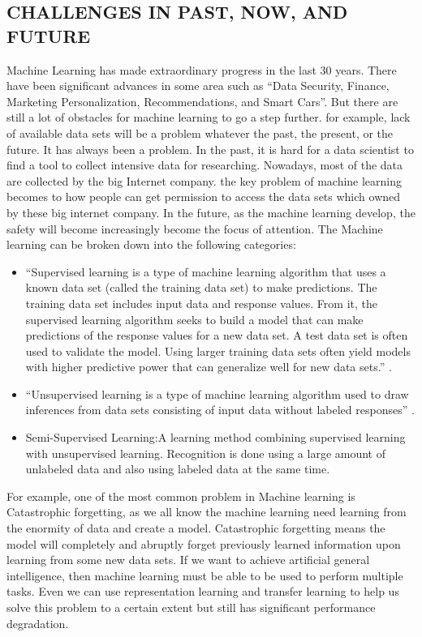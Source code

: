 \documentclass[sigconf]{acmart}
\begin{document}
\subsection{CHALLENGES IN PAST, NOW, AND FUTURE}
Machine Learning has made extraordinary progress in the last 30 years. There have been significant advances in some area such as ``Data Security, Finance, Marketing Personalization, Recommendations, and Smart Cars''. But there are still a lot of obstacles for machine learning to go a step further. for example, lack of available data sets will be a problem whatever the past, the present, or the future. It has always been a problem. In the past, it is hard for a data scientist to find a tool to collect intensive data for researching. Nowadays, most of the data are collected by the big Internet company. the key problem of machine learning becomes to how people can get permission to access the data sets which owned by these big internet company. In the future, as the machine learning develop, the safety will become increasingly become the focus of attention. The Machine learning can be broken down into the following categories:
\begin{itemize}

  \item ``Supervised learning is a type of machine learning algorithm that uses a known data set (called the training data set) to make predictions. The training data set includes input data and response values. From it, the supervised learning algorithm seeks to build a model that can make predictions of the response values for a new data set. A test data set is often used to validate the model. Using larger training data sets often yield models with higher predictive power that can generalize well for new data sets.'' \cite{Mathworks02}.
  
  
  \item ``Unsupervised learning is a type of machine learning algorithm used to draw inferences from data sets consisting of input data without labeled responses'' \cite{Mathworks01}.
  
  
  \item Semi-Supervised Learning:A learning method combining supervised learning with unsupervised learning. Recognition is done using a large amount of unlabeled data and also using labeled data at the same time.
  

  
\end{itemize}
For example, one of the most common problem in Machine learning is Catastrophic forgetting, as we all know the machine learning need learning from the enormity of data and create a model. Catastrophic forgetting means the model will completely and abruptly forget previously learned information upon learning from some new data sets. If we want to achieve artificial general intelligence, then machine learning must be able to be used to perform multiple tasks. Even we can use representation learning and transfer learning to help us solve this problem to a certain extent but still has significant performance degradation.
\end{document}
